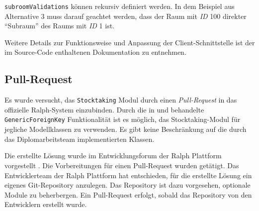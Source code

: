 \begin{Shaded}
\begin{Highlighting}[]
\FunctionTok{\{}
    \FunctionTok{:} \FunctionTok{,}
    \FunctionTok{:} \OtherTok{[}
    \OtherTok{]}\FunctionTok{,}
    \FunctionTok{:} \OtherTok{[}\FunctionTok{\{}
            \FunctionTok{:} \FunctionTok{,}
            \FunctionTok{:} \OtherTok{[}\FunctionTok{\{}
                    \FunctionTok{:} 
                \FunctionTok{\}}
            \OtherTok{]}\FunctionTok{,}
            \FunctionTok{:} \OtherTok{[}
            \OtherTok{]}
        \FunctionTok{\}}
    \OtherTok{]}
\FunctionTok{\}}
\end{Highlighting}
\end{Shaded}

\texttt{subroomValidations} können rekursiv definiert werden. In dem
Beispiel aus Alternative 3 muss darauf geachtet werden, dass der Raum
mit \emph{ID}
100 direkter ``Subraum'' des Raums mit \emph{ID}
1 ist.

Weitere Details zur Funktionsweise und Anpassung der
Client-Schnittstelle ist der im Source-Code enthaltenen Dokumentation zu
entnehmen.

\hypertarget{pull-request}{%
\subsection{Pull-Request}\label{pull-request}}

Es wurde versucht, das \texttt{Stocktaking} Modul durch einen
\emph{Pull-Request}
in das offizielle Ralph-System einzubinden. Durch die in
 und
 behandelte \texttt{GenericForeignKey}
Funktionalität \cite{django-doku-contenttypes} ist es möglich, das
Stocktaking-Modul für jegliche Modellklassen zu verwenden. Es gibt keine
Beschränkung auf die durch das Diplomarbeitsteam implementierten
Klassen.

Die erstellte Lösung wurde im Entwicklungsforum der Ralph Plattform
vorgestellt \cite{ralph-forum-1} \cite{ralph-forum-2}. Die
Vorbereitungen für einen Pull-Request wurden getätigt. Das
Entwicklerteam der Ralph Plattform hat entschieden, für die erstellte
Lösung ein eigenes Git-Repository anzulegen. Das Repository ist dazu
vorgesehen, optionale Module zu beherbergen. Ein Pull-Request erfolgt,
sobald das Repository von den Entwicklern erstellt wurde.
